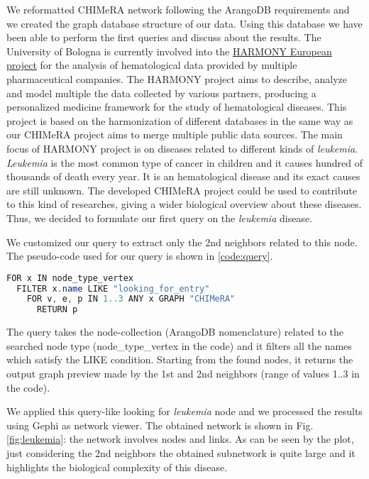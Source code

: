 \documentclass{standalone}
\begin{document}
We reformatted \textsf{CHIMeRA} network following the \textsf{ArangoDB} requirements and we created the graph database structure of our data.
Using this database we have been able to perform the first queries and discuss about the results.
The University of Bologna is currently involved into the \href{https://www.harmony-alliance.eu/}{HARMONY European project} for the analysis of hematological data provided by multiple pharmaceutical companies.
The HARMONY project aims to describe, analyze and model multiple the data collected by various partners, producing a personalized medicine framework for the study of hematological diseases.
This project is based on the harmonization of different databases in the same way as our \textsf{CHIMeRA} project aims to merge multiple public data sources.
The main focus of HARMONY project is on diseases related to different kinds of \emph{leukemia}.
\emph{Leukemia} is the most common type of cancer in children and it causes hundred of thousands of death every year.
It is an hematological disease and its exact causes are still unknown.
The developed \textsf{CHIMeRA} project could be used to contribute to this kind of researches, giving a wider biological overview about these diseases.
Thus, we decided to formulate our first query on the \emph{leukemia} disease.

We customized our query to extract only the 2nd neighbors related to this node.
The pseudo-code used for our query is shown in \ref{code:query}.

\lstset{style=Java}
\begin{lstlisting}[language=Java, caption=CHIMeRA 2nd neighbors query, label=code:query]
FOR x IN node_type_vertex
  FILTER x.name LIKE "looking_for_entry"
    FOR v, e, p IN 1..3 ANY x GRAPH "CHIMeRA"
      RETURN p
\end{lstlisting}

The query takes the node-collection (\textsf{ArangoDB} nomenclature) related to the searched node type (\textsf{node\_type\_vertex} in the code) and it filters all the names which satisfy the \textsf{LIKE} condition.
Starting from the found nodes, it returns the output graph preview made by the 1st and 2nd neighbors (range of values \textsf{1..3} in the code).

We applied this query-like looking for \emph{leukemia} node and we processed the results using \textsf{Gephi} as network viewer.
The obtained network is shown in Fig.\ref{fig:leukemia}: the network involves  nodes and  links.
As can be seen by the plot, just considering the 2nd neighbors the obtained subnetwork is quite large and it highlights the biological complexity of this disease.
\end{document}
